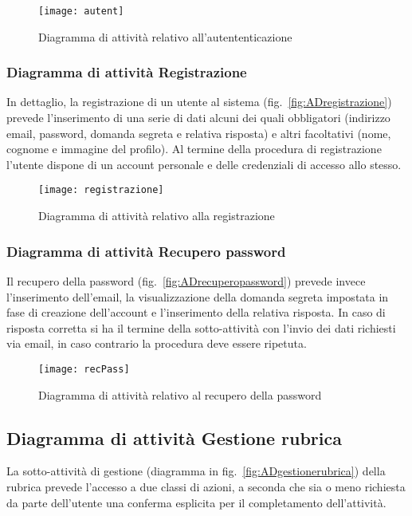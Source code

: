 \begin{figure}[H]
  \centering
  \texttt{[image: autent]}
  \caption{Diagramma di attività relativo all'autententicazione}\label{fig:ADautenticazione}
\end{figure}

\subsubsection{Diagramma di attività Registrazione}
In dettaglio, la registrazione di un utente al sistema (fig.~\vref{fig:ADregistrazione}) prevede l'inserimento di una serie di dati alcuni dei quali obbligatori (indirizzo email, password, domanda segreta e relativa risposta) e altri facoltativi (nome, cognome e immagine del profilo). Al termine della procedura di registrazione l'utente dispone di un account personale e delle credenziali di accesso allo stesso.

\begin{figure}[H]
  \centering
  \texttt{[image: registrazione]}
  \caption{Diagramma di attività relativo alla registrazione}\label{fig:ADregistrazione}
\end{figure}

\subsubsection{Diagramma di attività Recupero password}
Il recupero della password (fig.~\vref{fig:ADrecuperopassword}) prevede invece l'inserimento dell'email, la visualizzazione della domanda segreta impostata in fase di creazione dell'account e l'inserimento della relativa risposta. In caso di risposta corretta si ha il termine della sotto-attività con l'invio dei dati richiesti via email, in caso contrario la procedura deve essere ripetuta.

\begin{figure}[H]
  \centering
  \texttt{[image: recPass]}
  \caption{Diagramma di attività relativo al recupero della password}\label{fig:ADrecuperopassword}
\end{figure}

\subsection{Diagramma di attività Gestione rubrica}
La sotto-attività di gestione (diagramma in fig.~\vref{fig:ADgestionerubrica}) della rubrica prevede l'accesso a due classi di azioni, a seconda che sia o meno richiesta da parte dell'utente una conferma esplicita per il completamento dell'attività.

